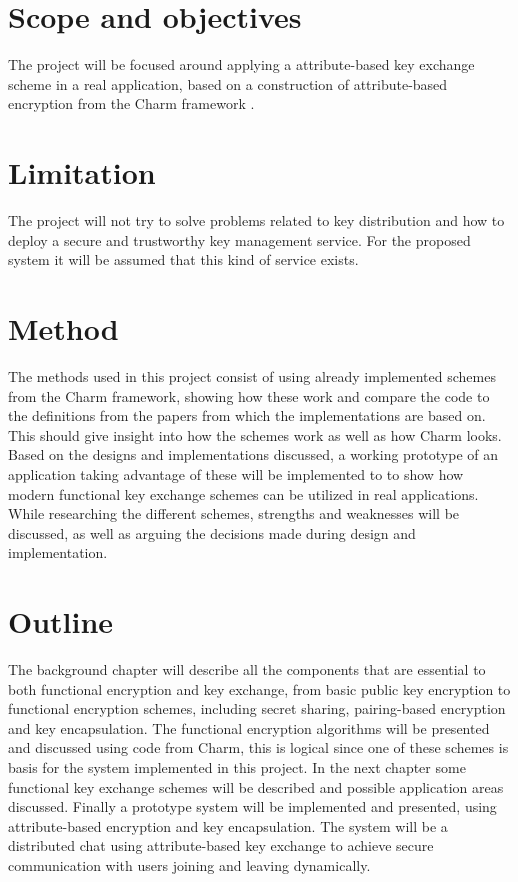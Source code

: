 \section{Scope and objectives}\label{sec:scope}

The project will be focused around applying a attribute-based key exchange scheme in a real application, based on a construction of attribute-based encryption from the Charm framework \cite{DBLP:Charm13}.


\section{Limitation}\label{sec:limitations}
The project will not try to solve problems related to key distribution and how to deploy a secure and trustworthy key management service. For the proposed system it will be assumed that this kind of service exists.

\section{Method}
The methods used in this project consist of using already implemented schemes from the Charm framework, showing how these work and compare the code to the definitions from the papers from which the implementations are based on. This should give insight into how the schemes work as well as how Charm looks. Based on the designs and implementations discussed, a working prototype of an application taking advantage of these will be implemented to to show how modern functional key exchange schemes can be utilized in real applications. While researching the different schemes, strengths and weaknesses will be discussed, as well as arguing the decisions made during design and implementation.


\section{Outline}\label{sec:outline}
The background chapter will describe all the components that are essential to both functional encryption and key exchange, from basic public key encryption to functional encryption schemes, including secret sharing, pairing-based encryption and key encapsulation. The functional encryption algorithms will be presented and discussed using code from Charm, this is logical since one of these schemes is basis for the system implemented in this project. In the next chapter some functional key exchange schemes will be described and possible application areas discussed. Finally a prototype system will be implemented and presented, using attribute-based encryption and key encapsulation. The system will be a distributed chat using attribute-based key exchange to achieve secure communication with users joining and leaving dynamically.
